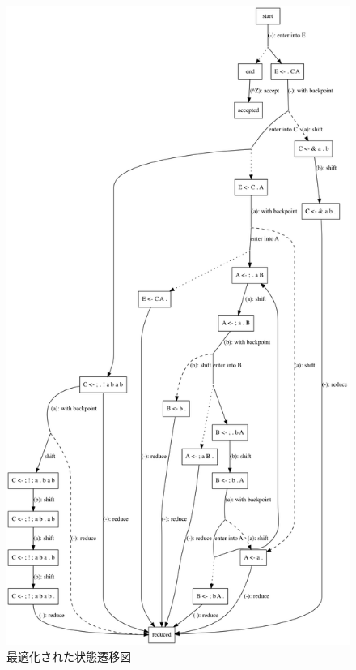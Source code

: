 \begin{figure}
  \centering
  \includegraphics[height=0.9\textheight]{asset/implementation-note-of-peg-parser/sample-grammar-optimized.png}
  \caption{最適化された状態遷移図}
\end{figure}
